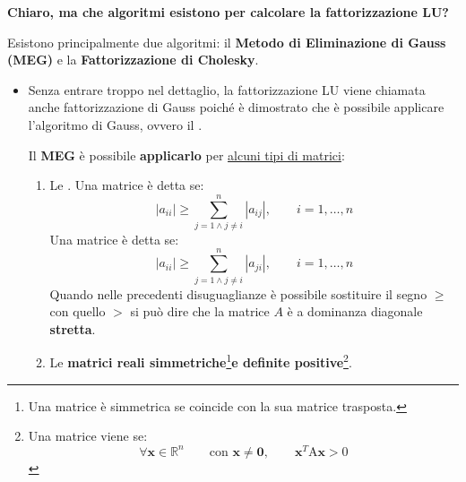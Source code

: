 \begin{flushleft}
    \textcolor{Green3}{ \textbf{Chiaro, ma che algoritmi esistono per calcolare la fattorizzazione LU?}}
\end{flushleft}
Esistono principalmente due algoritmi: il \textbf{Metodo di Eliminazione di Gauss (MEG)} e la \textbf{Fattorizzazione di Cholesky}.
\begin{itemize}
    \item Senza entrare troppo nel dettaglio, la fattorizzazione LU viene chiamata anche fattorizzazione di Gauss poiché è dimostrato che è possibile applicare l'algoritmo di Gauss, ovvero il .

    Il \textbf{MEG} è possibile \textbf{applicarlo} per \underline{alcuni tipi di matrici}:
    \begin{enumerate}
        \item Le . Una matrice è detta  se:
        \begin{equation}
            \left| a_{ii} \right| \ge \displaystyle\sum_{j=1 \land j \ne i}^{n} \left| a_{ij} \right|, \hspace{2em} i = 1, \dots, n
        \end{equation}
        Una matrice è detta  se:
        \begin{equation}
            \left| a_{ii} \right| \ge \displaystyle\sum_{j=1 \land j \ne i}^{n} \left| a_{ji} \right|, \hspace{2em} i = 1, \dots, n
        \end{equation}
        Quando nelle precedenti disuguaglianze è possibile sostituire il segno $\ge$ con quello $>$ si può dire che la matrice $A$ è a dominanza diagonale \textbf{stretta}.

        \item Le \textbf{matrici reali simmetriche}\footnote{Una matrice è simmetrica se coincide con la sua matrice trasposta.}\textbf{e definite positive}\footnote{Una matrice viene \label{matrice definita positiva} se:
        \begin{equation*}
            \forall \mathbf{x} \in \mathbb{R}^{n} \hspace{2em} \text{con } \mathbf{x} \ne \mathbf{0}, \hspace{2em} \mathbf{x}^{T} \mathrm{A}\mathbf{x} > 0
        \end{equation*}}.
    \end{enumerate}


\end{itemize}
